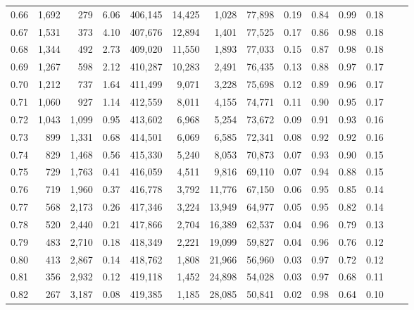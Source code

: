 \begin{tabular}{rrrrrrrrrrrrrr}
0.66 &  1,692 &    279 &     6.06 &  406,145 &   14,425 &   1,028 &  77,898 &  0.19 &  0.84 &  0.99 &      0.18 \\
0.67 &  1,531 &    373 &     4.10 &  407,676 &   12,894 &   1,401 &  77,525 &  0.17 &  0.86 &  0.98 &      0.18 \\
0.68 &  1,344 &    492 &     2.73 &  409,020 &   11,550 &   1,893 &  77,033 &  0.15 &  0.87 &  0.98 &      0.18 \\
0.69 &  1,267 &    598 &     2.12 &  410,287 &   10,283 &   2,491 &  76,435 &  0.13 &  0.88 &  0.97 &      0.17 \\
0.70 &  1,212 &    737 &     1.64 &  411,499 &    9,071 &   3,228 &  75,698 &  0.12 &  0.89 &  0.96 &      0.17 \\
0.71 &  1,060 &    927 &     1.14 &  412,559 &    8,011 &   4,155 &  74,771 &  0.11 &  0.90 &  0.95 &      0.17 \\
0.72 &  1,043 &  1,099 &     0.95 &  413,602 &    6,968 &   5,254 &  73,672 &  0.09 &  0.91 &  0.93 &      0.16 \\
0.73 &    899 &  1,331 &     0.68 &  414,501 &    6,069 &   6,585 &  72,341 &  0.08 &  0.92 &  0.92 &      0.16 \\
0.74 &    829 &  1,468 &     0.56 &  415,330 &    5,240 &   8,053 &  70,873 &  0.07 &  0.93 &  0.90 &      0.15 \\
0.75 &    729 &  1,763 &     0.41 &  416,059 &    4,511 &   9,816 &  69,110 &  0.07 &  0.94 &  0.88 &      0.15 \\
0.76 &    719 &  1,960 &     0.37 &  416,778 &    3,792 &  11,776 &  67,150 &  0.06 &  0.95 &  0.85 &      0.14 \\
0.77 &    568 &  2,173 &     0.26 &  417,346 &    3,224 &  13,949 &  64,977 &  0.05 &  0.95 &  0.82 &      0.14 \\
0.78 &    520 &  2,440 &     0.21 &  417,866 &    2,704 &  16,389 &  62,537 &  0.04 &  0.96 &  0.79 &      0.13 \\
0.79 &    483 &  2,710 &     0.18 &  418,349 &    2,221 &  19,099 &  59,827 &  0.04 &  0.96 &  0.76 &      0.12 \\
0.80 &    413 &  2,867 &     0.14 &  418,762 &    1,808 &  21,966 &  56,960 &  0.03 &  0.97 &  0.72 &      0.12 \\
0.81 &    356 &  2,932 &     0.12 &  419,118 &    1,452 &  24,898 &  54,028 &  0.03 &  0.97 &  0.68 &      0.11 \\
0.82 &    267 &  3,187 &     0.08 &  419,385 &    1,185 &  28,085 &  50,841 &  0.02 &  0.98 &  0.64 &      0.10 \\

\end{tabular}

